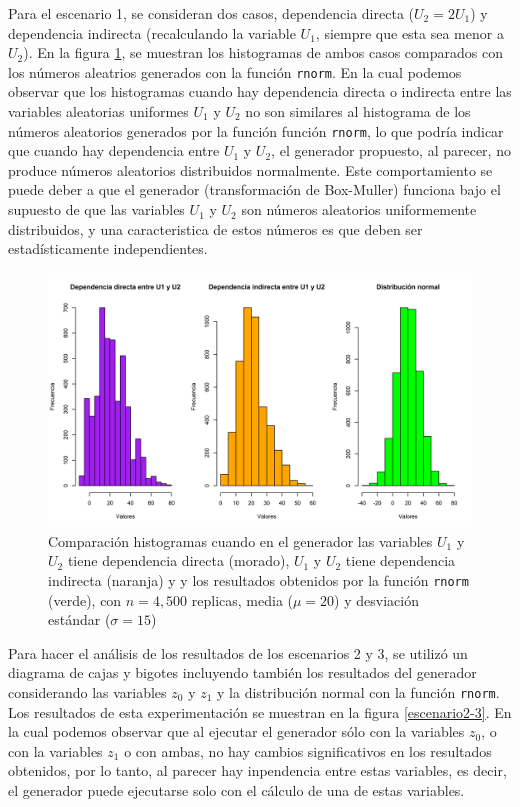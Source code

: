 \documentclass{article}
\begin{document}
Para el escenario 1, se consideran dos casos, dependencia directa ($U_{2} = 2U_{1}$) y dependencia indirecta (recalculando la variable $U_{1}$, siempre que esta sea menor a $U_{2}$). En la figura \ref{escenario1}, se muestran los histogramas de ambos casos comparados con los números aleatrios generados con la función \texttt{rnorm}. En la cual podemos observar que los histogramas cuando hay dependencia directa o indirecta entre las variables aleatorias uniformes $U_{1}$ y $U_{2}$ no son similares al histograma de los números aleatorios generados por la función función \texttt{rnorm}, lo que podría indicar que cuando hay dependencia entre $U_{1}$ y $U_{2}$, el generador propuesto, al parecer, no produce números aleatorios distribuidos normalmente. Este comportamiento se puede deber a que el generador (transformación de Box-Muller) funciona bajo el supuesto de que las variables $U_{1}$ y $U_{2}$ son números aleatorios uniformemente distribuidos, y una caracteristica de estos números es que deben ser estadísticamente independientes.

\begin{figure}
\centering
\includegraphics[width=\linewidth]{Figures/comparativosU.png}
\caption{Comparación histogramas cuando en el generador las variables $U_{1}$ y $U_{2}$ tiene dependencia directa (morado), $U_{1}$ y $U_{2}$ tiene dependencia indirecta (naranja) y y los resultados obtenidos por la función \texttt{rnorm} (verde), con $n= 4,500$ replicas, media ($\mu = 20$) y desviación estándar ($\sigma = 15$)}
\label{escenario1}
\end{figure}


Para hacer el análisis de los resultados de los escenarios 2 y 3, se utilizó un diagrama de cajas y bigotes incluyendo también los resultados del generador considerando las variables $z_{0}$ y $z_{1}$ y la distribución normal con la función \texttt{rnorm}. Los resultados de esta experimentación se muestran en la figura \ref{escenario2-3}. En la cual podemos observar que al ejecutar el generador sólo con la variables $z_{0}$, o con la variables $z_{1}$ o con ambas, no hay cambios significativos en los resultados obtenidos, por lo tanto, al parecer hay inpendencia entre estas variables, es decir, el generador puede ejecutarse solo con el cálculo de una de estas variables.
\end{document}
